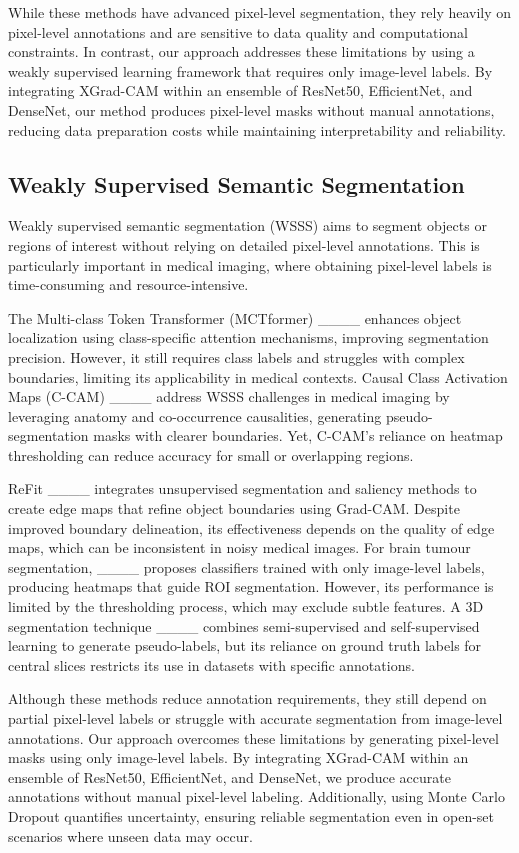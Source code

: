 While these methods have advanced pixel-level segmentation, they rely heavily on pixel-level annotations and are sensitive to data quality and computational constraints. In contrast, our approach addresses these limitations by using a weakly supervised learning framework that requires only image-level labels. By integrating XGrad-CAM within an ensemble of ResNet50, EfficientNet, and DenseNet, our method produces pixel-level masks without manual annotations, reducing data preparation costs while maintaining interpretability and reliability.

\subsection{Weakly Supervised Semantic Segmentation}

Weakly supervised semantic segmentation (WSSS) aims to segment objects or regions of interest without relying on detailed pixel-level annotations. This is particularly important in medical imaging, where obtaining pixel-level labels is time-consuming and resource-intensive.

The Multi-class Token Transformer (MCTformer) ____ enhances object localization using class-specific attention mechanisms, improving segmentation precision. However, it still requires class labels and struggles with complex boundaries, limiting its applicability in medical contexts. Causal Class Activation Maps (C-CAM) ____ address WSSS challenges in medical imaging by leveraging anatomy and co-occurrence causalities, generating pseudo-segmentation masks with clearer boundaries. Yet, C-CAM’s reliance on heatmap thresholding can reduce accuracy for small or overlapping regions.

ReFit ____ integrates unsupervised segmentation and saliency methods to create edge maps that refine object boundaries using Grad-CAM. Despite improved boundary delineation, its effectiveness depends on the quality of edge maps, which can be inconsistent in noisy medical images. For brain tumour segmentation, ____ proposes classifiers trained with only image-level labels, producing heatmaps that guide ROI segmentation. However, its performance is limited by the thresholding process, which may exclude subtle features. A 3D segmentation technique ____ combines semi-supervised and self-supervised learning to generate pseudo-labels, but its reliance on ground truth labels for central slices restricts its use in datasets with specific annotations.

Although these methods reduce annotation requirements, they still depend on partial pixel-level labels or struggle with accurate segmentation from image-level annotations. Our approach overcomes these limitations by generating pixel-level masks using only image-level labels. By integrating XGrad-CAM within an ensemble of ResNet50, EfficientNet, and DenseNet, we produce accurate annotations without manual pixel-level labeling. Additionally, using Monte Carlo Dropout quantifies uncertainty, ensuring reliable segmentation even in open-set scenarios where unseen data may occur.

